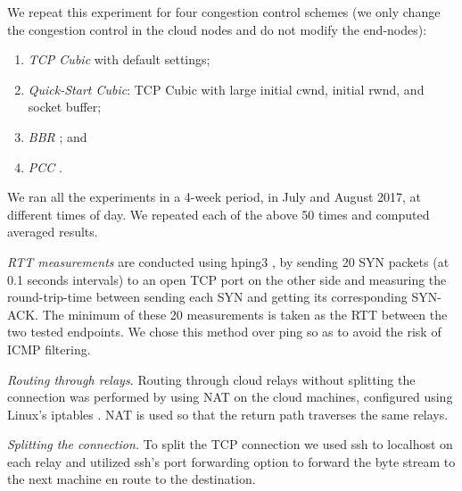 \documentclass[sigconf,usenames,dvipsnames,geometry]{acmart}
\newcommand{\mycomm}[3]{{\color{#2} \textbf{[#1: #3]}}}
\newcommand{\mycomm}[3]{}
\newcommand{\IK}[1]{\mycomm{IK}{blue}{#1}}
\newcommand{\AB}[1]{\mycomm{AB}{Orange}{#1}}
\def\compactify{\itemsep=0pt \topsep=0pt \partopsep=0pt \parsep=0pt}
\let\latexusecounter=\usecounter
\newenvironment{CompactEnumerate}
    {\def\usecounter{\compactify\latexusecounter}
     \begin{enumerate}}
    {\end{enumerate}\let\usecounter=\latexusecounter}
\newcommand{\PST}[1]{\smallskip\noindent\textit{#1}} %
\begin{document}
We repeat this experiment for four congestion control schemes (we only change the congestion control in the cloud nodes and do not modify the end-nodes):
\begin{CompactEnumerate}
      \item \textit{TCP Cubic} with default settings;
      \item \textit{Quick-Start Cubic}: TCP Cubic with large initial cwnd, initial rwnd, and socket buffer;
      \item \textit{BBR} \cite{BBR}; and
      \item \textit{PCC} \cite{PCC}.
\end{CompactEnumerate} 
We ran all the experiments in a 4-week period, in July and August 2017, at different times of day. We repeated each of the above 50 times and computed averaged results.

\ifblind \else
\smallskip{} \textit{RTT measurements} are conducted using hping3 \cite{hping3}, by sending 20 SYN packets (at 0.1 seconds intervals) to an open TCP port on the other side and measuring the round-trip-time between sending each SYN and getting its corresponding SYN-ACK. The minimum of these 20 measurements is taken as the RTT between the two tested endpoints. We chose this method over ping so as to avoid the risk of ICMP filtering.

\PST{Routing through relays.} Routing through cloud relays without splitting the connection was performed by using NAT on the cloud machines, configured using Linux's iptables \cite{iptables}. NAT is used so that the return path traverses the same relays.

\PST{Splitting the connection.} To split the TCP connection we used ssh to localhost on each relay and utilized ssh's port forwarding option to forward the byte stream to the next machine en route to the destination.
\fi



\end{document}
